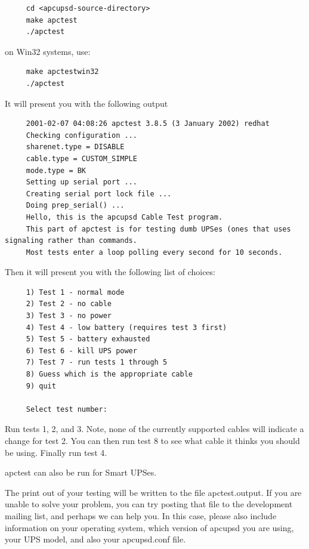 {{{{{{{{{\footnotesize
\begin{verbatim}
     cd <apcupsd-source-directory>
     make apctest
     ./apctest
\end{verbatim}
\normalsize

on Win32 systems, use: 

\footnotesize
\begin{verbatim}
     make apctestwin32
     ./apctest
\end{verbatim}
\normalsize

It will present you with the following output 

\footnotesize
\begin{verbatim}
     2001-02-07 04:08:26 apctest 3.8.5 (3 January 2002) redhat
     Checking configuration ...
     sharenet.type = DISABLE
     cable.type = CUSTOM_SIMPLE
     mode.type = BK
     Setting up serial port ...
     Creating serial port lock file ...
     Doing prep_serial() ...
     Hello, this is the apcupsd Cable Test program.
     This part of apctest is for testing dumb UPSes (ones that uses signaling rather than commands.
     Most tests enter a loop polling every second for 10 seconds.
\end{verbatim}
\normalsize

Then it will present you with the following list of choices: 

\footnotesize
\begin{verbatim}
     1) Test 1 - normal mode
     2) Test 2 - no cable
     3) Test 3 - no power
     4) Test 4 - low battery (requires test 3 first)
     5) Test 5 - battery exhausted
     6) Test 6 - kill UPS power
     7) Test 7 - run tests 1 through 5
     8) Guess which is the appropriate cable
     9) quit
     
     Select test number:
\end{verbatim}
\normalsize

Run tests 1, 2, and 3. Note, none of the currently supported cables will
indicate a change for test 2. You can then run test 8 to see what cable it
thinks you should be using. Finally run test 4.  

apctest can also be run for Smart UPSes.  

The print out of your testing will be written to the file apctest.output. If
you are unable to solve your problem, you can try posting that file to the
development mailing list, and perhaps we can help you. In this case, please
also include information on your operating system, which version of apcupsd
you are using, your UPS model, and also your apcupsd.conf file. 

}}}}}}}}}

